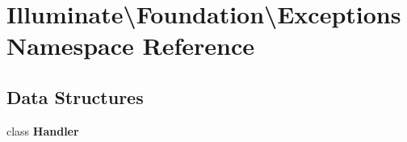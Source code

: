 \section{Illuminate\textbackslash{}Foundation\textbackslash{}Exceptions Namespace Reference}
\label{namespace_illuminate_1_1_foundation_1_1_exceptions}
\subsection*{Data Structures}
\begin{DoxyCompactItemize}
\item 
class {\bf Handler}
\end{DoxyCompactItemize}
